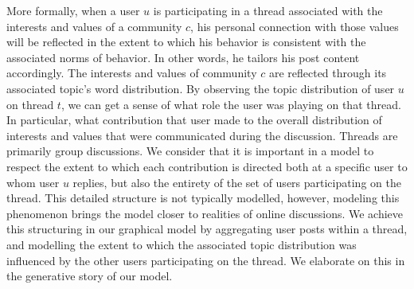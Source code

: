\documentclass{sig-alternate}
\newcommand{\comment}[1]{\textcolor{red}{[#1]}}
\begin{document}
More formally, when a user $u$ is participating in a thread associated with the interests and values of a community $c$, his personal connection 
with those values will be reflected in the extent to which his behavior is consistent with the associated
norms of behavior.  In other words, he tailors his post content accordingly. The interests and values of community $c$ are reflected through its associated topic's
word distribution.  By observing the topic distribution of user $u$ on thread $t$, we can get a sense of what role the user was playing on that thread.
In particular, what contribution that user made to the overall distribution of interests and values that were communicated during the discussion.  Threads are primarily group discussions.  We consider that it is important in a model to respect the extent to which each contribution is directed both at a specific user to whom user $u$ replies, but also the entirety of the set of users participating on the thread.  This detailed structure is not typically modelled, however, modeling this phenomenon brings the model closer to realities of online discussions.  We achieve this structuring in our graphical model by aggregating user posts within a thread, and modelling the extent to which the associated topic distribution was influenced by the other users participating on the thread.  We
 elaborate on this in the
generative story of our model. 
\end{document}

